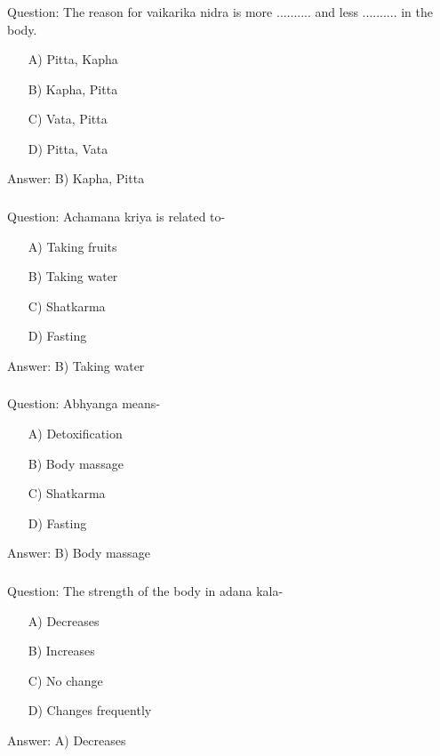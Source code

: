 \begin{frame}[fragile]\frametitle{}

Question: The reason for vaikarika nidra is more .......... and less .......... in the body.

\begin{itemize}
\item[A)] Pitta, Kapha
\item[B)] Kapha, Pitta
\item[C)] Vata, Pitta
\item[D)] Pitta, Vata
\end{itemize}

Answer: B) Kapha, Pitta
\end{frame}

\begin{frame}[fragile]\frametitle{}

Question: Achamana kriya is related to-

\begin{itemize}
\item[A)] Taking fruits
\item[B)] Taking water
\item[C)] Shatkarma
\item[D)] Fasting
\end{itemize}

Answer: B) Taking water
\end{frame}

\begin{frame}[fragile]\frametitle{}

Question: Abhyanga means-

\begin{itemize}
\item[A)] Detoxification
\item[B)] Body massage
\item[C)] Shatkarma
\item[D)] Fasting
\end{itemize}

Answer: B) Body massage
\end{frame}

\begin{frame}[fragile]\frametitle{}

Question: The strength of the body in adana kala-

\begin{itemize}
\item[A)] Decreases
\item[B)] Increases
\item[C)] No change
\item[D)] Changes frequently
\end{itemize}

Answer: A) Decreases
\end{frame}

